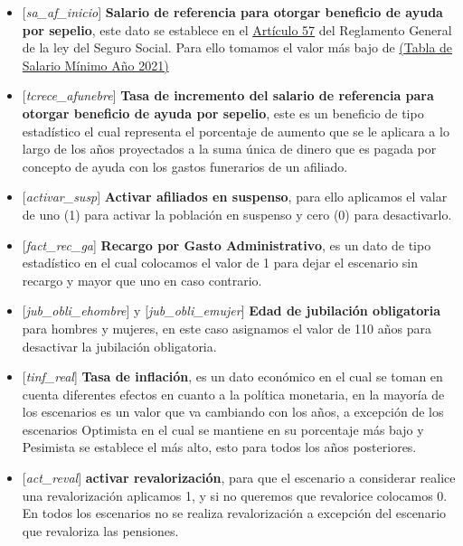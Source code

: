 \documentclass[
  letterpaper,
  DIV=11,
  numbers=noendperiod]{scrreprt}
\begin{document}
\begin{itemize}
\item
  {[}\emph{sa\_af\_inicio}{]} \textbf{Salario de referencia para otorgar
  beneficio de ayuda por sepelio}, este dato se establece en el
  \href{https://www.ilo.org/dyn/travail/docs/930/Reglamento\%20General\%20de\%20la\%20\%20Ley\%20del\%20IHSS.pdf}{Artículo
  57} del Reglamento General de la ley del Seguro Social. Para ello
  tomamos el valor más bajo de
  \href{https://www.ccichonduras.org/spanish/comunicados/2021/Junio/TABLA\%20AJUSTE\%20SALARIO\%20MINIMO.pdf}{(Tabla
  de Salario Mínimo Año 2021)}
\item
  {[}\emph{tcrece\_afunebre}{]} \textbf{Tasa de incremento del salario
  de referencia para otorgar beneficio de ayuda por sepelio}, este es un
  beneficio de tipo estadístico el cual representa el porcentaje de
  aumento que se le aplicara a lo largo de los años proyectados a la
  suma única de dinero que es pagada por concepto de ayuda con los
  gastos funerarios de un afiliado.
\item
  {[}\emph{activar\_susp}{]} \textbf{Activar afiliados en suspenso},
  para ello aplicamos el valar de uno (1) para activar la población en
  suspenso y cero (0) para desactivarlo.
\item
  {[}\emph{fact\_rec\_ga}{]} \textbf{Recargo por Gasto Administrativo},
  es un dato de tipo estadístico en el cual colocamos el valor de 1 para
  dejar el escenario sin recargo y mayor que uno en caso contrario.
\item
  {[}\emph{jub\_obli\_ehombre}{]} y {[}\emph{jub\_obli\_emujer}{]}
  \textbf{Edad de jubilación obligatoria} para hombres y mujeres, en
  este caso asignamos el valor de 110 años para desactivar la jubilación
  obligatoria.
\item
  {[}\emph{tinf\_real}{]} \textbf{Tasa de inflación}, es un dato
  económico en el cual se toman en cuenta diferentes efectos en cuanto a
  la política monetaria, en la mayoría de los escenarios es un valor que
  va cambiando con los años, a excepción de los escenarios Optimista en
  el cual se mantiene en su porcentaje más bajo y Pesimista se establece
  el más alto, esto para todos los años posteriores.
\item
  {[}\emph{act\_reval}{]} \textbf{activar revalorización}, para que el
  escenario a considerar realice una revalorización aplicamos 1, y si no
  queremos que revalorice colocamos 0. En todos los escenarios no se
  realiza revalorización a excepción del escenario que revaloriza las
  pensiones.
\end{itemize}
\end{document}
